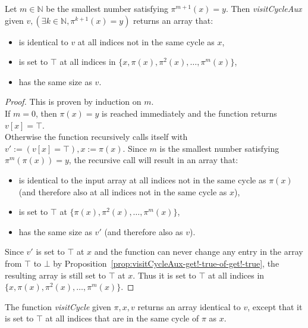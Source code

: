 \begin{proposition}
  \label{prop:visitCycleAux-spec}
  \leanok
  Let $m \in \mathbb{N}$ be the smallest number satisfying $\pi^{m + 1}(x) = y$. Then \emph{visitCycleAux} given $v, (\exists k \in \mathbb{N}, \pi^{k + 1}(x) = y)$ returns an array that:  
  \begin{itemize}
    \item is identical to $v$ at all indices not in the same cycle as $x$,
    \item is set to $\top$ at all indices in $\{x, \pi(x), \pi^2(x), \dots, \pi^m(x)\}$,
    \item has the same size as $v$.
  \end{itemize}
\end{proposition}

\begin{proof}
  \leanok
  This is proven by induction on $m$.\\
  If $m = 0$, then $\pi(x) = y$ is reached immediately and the function returns $v[x] = \top$.\\
  Otherwise the function recursively calls itself with $v' := (v[x] = \top), x := \pi(x)$. Since $m$ is the smallest number satisfying $\pi^m(\pi(x)) = y$, the recursive call will result in an array that:
  \begin{itemize}
    \item is identical to the input array at all indices not in the same cycle as $\pi(x)$ (and therefore also at all indices not in the same cycle as $x$),
    \item is set to $\top$ at $\{\pi(x), \pi^2(x), \dots, \pi^m(x)\}$,
    \item has the same size as $v'$ (and therefore also as $v$).
  \end{itemize}
  Since $v'$ is set to $\top$ at $x$ and the function can never change any entry in the array from $\top$ to $\bot$ by Proposition~\ref{prop:visitCycleAux-get!-true-of-get!-true}, the resulting array is still set to $\top$ at $x$. Thus it is set to $\top$ at all indices in $\{x, \pi(x), \pi^2(x), \dots, \pi^m(x)\}$.
\end{proof}

\begin{proposition}
  \label{prop:visitCycle-spec}
  \leanok
  The function \emph{visitCycle} given $\pi, x, v$ returns an array identical to $v$, except that it is set to $\top$ at all indices that are in the same cycle of $\pi$ as $x$.
\end{proposition}

